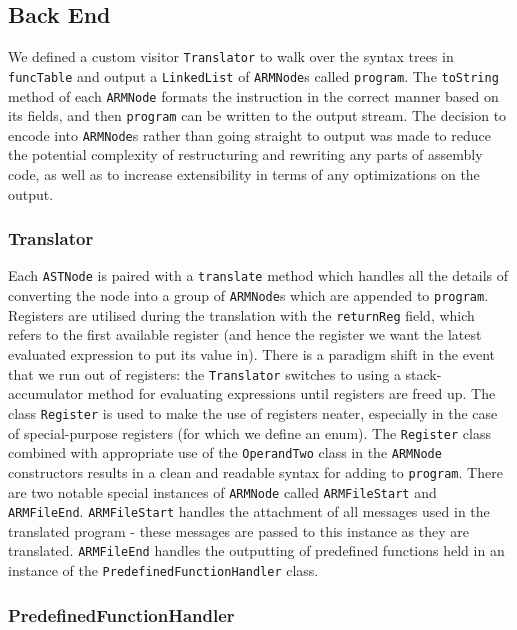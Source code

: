 \documentclass[a4wide, 10pt]{article}
\begin{document}
\subsection*{Back End}

We defined a custom visitor \texttt{Translator} to walk over the syntax trees in \texttt{funcTable} and output a \texttt{LinkedList} of \texttt{ARMNode}s called \texttt{program}. The \texttt{toString} method of each \texttt{ARMNode} formats the instruction in the correct manner based on its fields, and then \texttt{program} can be written to the output stream. The decision to encode into \texttt{ARMNode}s rather than going straight to output was made to reduce the potential complexity of restructuring and rewriting any parts of assembly code, as well as to increase extensibility in terms of any optimizations on the output. 

\subsubsection*{Translator} 

Each \texttt{ASTNode} is paired with a \texttt{translate} method which handles all the details of converting the node into a group of \texttt{ARMNode}s which are appended to \texttt{program}. Registers are utilised during the translation with the \texttt{returnReg} field, which refers to the first available register (and hence the register we want the latest evaluated expression to put its value in). There is a paradigm shift in the event that we run out of registers: the \texttt{Translator} switches to using a stack-accumulator method for evaluating expressions until registers are freed up. The class \texttt{Register} is used to make the use of registers neater, especially in the case of special-purpose registers (for which we define an enum). The \texttt{Register} class combined with appropriate use of the \texttt{OperandTwo} class in the \texttt{ARMNode} constructors results in a clean and readable syntax for adding to \texttt{program}. There are two notable special instances of \texttt{ARMNode} called \texttt{ARMFileStart} and \texttt{ARMFileEnd}. \texttt{ARMFileStart} handles the attachment of all messages used in the translated program - these messages are passed to this instance as they are translated. \texttt{ARMFileEnd} handles the outputting of predefined functions held in an instance of the \texttt{PredefinedFunctionHandler} class. 

\subsubsection*{PredefinedFunctionHandler}
\end{document}
